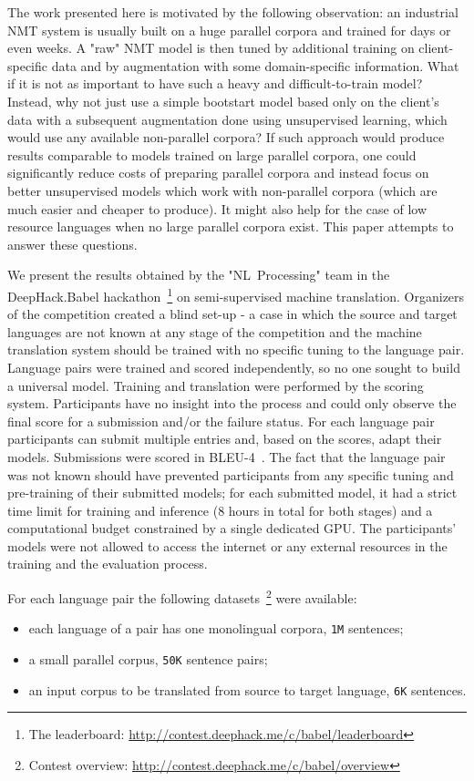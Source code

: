 \documentclass[]{article}
\begin{document}
The work presented here is motivated by the following observation: an industrial \ac{NMT} system is usually built on a huge parallel corpora and trained for days or even weeks.
A "raw" \ac{NMT} model is then tuned by additional training on client-specific data and by augmentation with some domain-specific information.
What if it is not as important to have such a heavy and difficult-to-train model?
Instead, why not just use a simple bootstart model based only on the client's data with a subsequent augmentation done using unsupervised learning, which would use any available non-parallel corpora?
If such approach would produce results comparable to models trained on large parallel corpora, one could significantly reduce costs of preparing parallel corpora and instead focus on better unsupervised models which work with non-parallel corpora (which are much easier and cheaper to produce).
It might also help for the case of low resource languages when no large parallel corpora exist.
This paper attempts to answer these questions.

We present the results obtained by the "NL~Processing" team in the DeepHack.Babel hackathon~\footnote{The leaderboard: \url{http://contest.deephack.me/c/babel/leaderboard}} on semi-supervised machine translation.
Organizers of the competition created a blind set-up - a case in which the source and target languages are not known at any stage of the competition and the machine translation system should be trained with no specific tuning to the language pair.
Language pairs were trained and scored independently, so no one sought to build a universal model.
Training and translation were performed by the scoring system.
Participants have no insight into the process and could only observe the final score for a submission and/or the failure status.
For each language pair participants can submit multiple entries and, based on the scores, adapt their models.
Submissions were scored in BLEU-4~\citep{papineni2002bleu}.
The fact that the language pair was not known should have prevented participants from any specific tuning and pre-training of their submitted models; for each submitted model, it had a strict time limit for training and inference (8 hours in total for both stages) and a computational budget constrained by a single dedicated GPU.
The participants' models were not allowed to access the internet or any external resources in the training and the evaluation process.

For each language pair the following datasets~\footnote{Contest overview: \url{http://contest.deephack.me/c/babel/overview}} were available:
\begin{itemize}
  \item each language of a pair has one monolingual corpora, {\tt 1M} sentences;
  \item a small parallel corpus, {\tt 50K} sentence pairs;
  \item an input corpus to be translated from source to target language, {\tt 6K} sentences.
\end{itemize}
\end{document}
